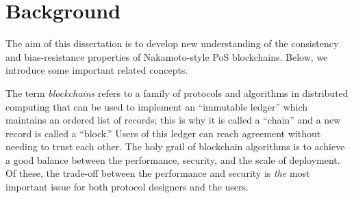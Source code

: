 



\section{Background}\label{sec:background-intro}




The aim of this dissertation 
is to develop new understanding 
of the consistency and bias-resistance properties of 
Nakamoto-style PoS blockchains. 
Below, we introduce some important related concepts.




The term \emph{blockchains} refers to a family of protocols and algorithms 
in distributed computing 
that can be used to implement an ``immutable ledger'' 
which maintains an ordered list of records; 
this is why it is called a ``chain'' and a new record is called a ``block.''
Users of this ledger can reach agreement without needing to trust each other. 
The holy grail of blockchain algorithms is to achieve a good balance between 
the performance, security, and the scale of deployment. 
Of these, the trade-off between the performance and security 
is \emph{the} most important issue for both protocol designers and the users.

